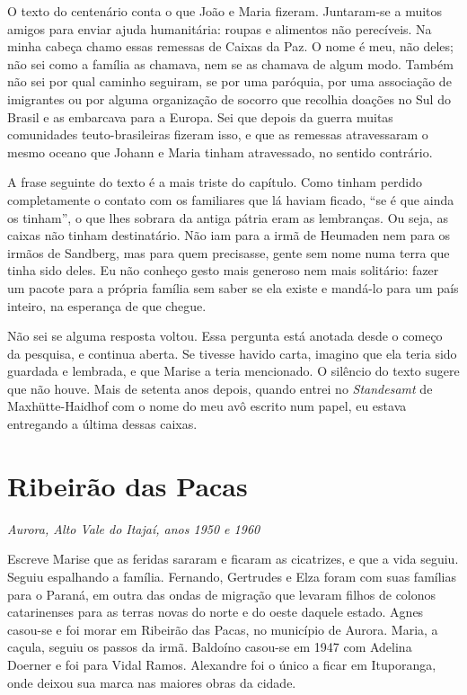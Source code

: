 \documentclass[
  brazilian,
  11pt,
  openany]{book}
\begin{document}
O texto do centenário conta o que João e Maria fizeram. Juntaram-se a
muitos amigos para enviar ajuda humanitária: roupas e alimentos não
perecíveis. Na minha cabeça chamo essas remessas de Caixas da Paz. O
nome é meu, não deles; não sei como a família as chamava, nem se as
chamava de algum modo. Também não sei por qual caminho seguiram, se por
uma paróquia, por uma associação de imigrantes ou por alguma organização
de socorro que recolhia doações no Sul do Brasil e as embarcava para a
Europa. Sei que depois da guerra muitas comunidades teuto-brasileiras
fizeram isso, e que as remessas atravessaram o mesmo oceano que Johann e
Maria tinham atravessado, no sentido contrário.

A frase seguinte do texto é a mais triste do capítulo. Como tinham
perdido completamente o contato com os familiares que lá haviam ficado,
``se é que ainda os tinham'', o que lhes sobrara da antiga pátria eram
as lembranças. Ou seja, as caixas não tinham destinatário. Não iam para
a irmã de Heumaden nem para os irmãos de Sandberg, mas para quem
precisasse, gente sem nome numa terra que tinha sido deles. Eu não
conheço gesto mais generoso nem mais solitário: fazer um pacote para a
própria família sem saber se ela existe e mandá-lo para um país inteiro,
na esperança de que chegue.

Não sei se alguma resposta voltou. Essa pergunta está anotada desde o
começo da pesquisa, e continua aberta. Se tivesse havido carta, imagino
que ela teria sido guardada e lembrada, e que Marise a teria mencionado.
O silêncio do texto sugere que não houve. Mais de setenta anos depois,
quando entrei no \emph{Standesamt} de Maxhütte-Haidhof com o nome do meu
avô escrito num papel, eu estava entregando a última dessas caixas.

\section{Ribeirão das Pacas}\label{ribeiruxe3o-das-pacas}

\emph{Aurora, Alto Vale do Itajaí, anos 1950 e 1960}

Escreve Marise que as feridas sararam e ficaram as cicatrizes, e que a
vida seguiu. Seguiu espalhando a família. Fernando, Gertrudes e Elza
foram com suas famílias para o Paraná, em outra das ondas de migração
que levaram filhos de colonos catarinenses para as terras novas do norte
e do oeste daquele estado. Agnes casou-se e foi morar em Ribeirão das
Pacas, no município de Aurora. Maria, a caçula, seguiu os passos da
irmã. Baldoíno casou-se em 1947 com Adelina Doerner e foi para Vidal
Ramos. Alexandre foi o único a ficar em Ituporanga, onde deixou sua
marca nas maiores obras da cidade.
\end{document}
